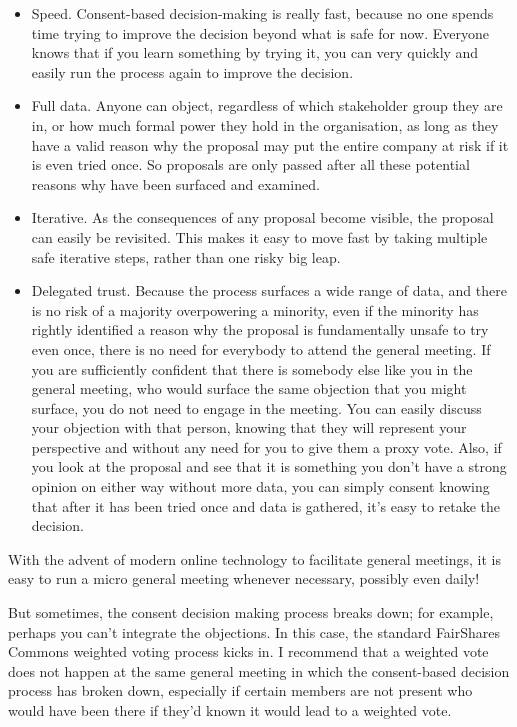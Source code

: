 \begin{itemize}
\item Speed. Consent-based decision-making is really fast, because no one spends time trying to improve the decision beyond what is safe for now. Everyone knows that if you learn something by trying it, you can very quickly and easily run the process again to improve the decision.


\item Full data. Anyone can object, regardless of which stakeholder group they are in, or how much formal power they hold in the organisation, as long as they have a valid reason why the proposal may put the entire company at risk if it is even tried once. So proposals are only passed after all these potential reasons why have been surfaced and examined.


\item Iterative. As the consequences of any proposal become visible, the proposal can easily be revisited. This makes it easy to move fast by taking multiple safe iterative steps, rather than one risky big leap.


\item Delegated trust. Because the process surfaces a wide range of data, and there is no risk of a majority overpowering a minority, even if the minority has rightly identified a reason why the proposal is fundamentally unsafe to try even once, there is no need for everybody to attend the general meeting. If you are sufficiently confident that there is somebody else like you in the general meeting, who would surface the same objection that you might surface, you do not need to engage in the meeting. You can easily discuss your objection with that person, knowing that they will represent your perspective and without any need for you to give them a proxy vote. Also, if you look at the proposal and see that it is something you don't have a strong opinion on either way without more data, you can simply consent knowing that after it has been tried once and data is gathered, it’s easy to retake the decision.
\end{itemize}


With the advent of modern online technology to facilitate general meetings, it is easy to run a micro general meeting whenever necessary, possibly even daily!


But sometimes, the consent decision making process breaks down; for example, perhaps you can’t integrate the objections. In this case, the standard FairShares Commons weighted voting process kicks in. I recommend that a weighted vote does not happen at the same general meeting in which the consent-based decision process has broken down, especially if certain members are not present who would have been there if they’d known it would lead to a weighted vote.


